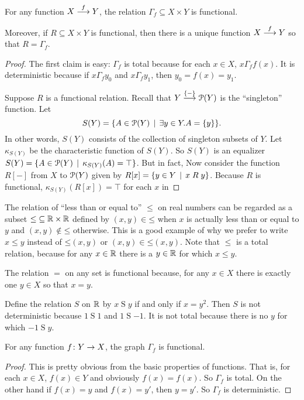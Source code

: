 \begin{lemma}
	For any function $\sfromto fXY$, the relation $\Gamma_f\subseteq X\times Y$ is functional.
	
	Moreover, if $R\subseteq X\times Y$ is functional, then there is a unique function $\sfromto fXY$ so that $R = \Gamma_f$.
	
	\begin{proof}
		The first claim is easy: $\Gamma_f$ is total because for each $x\in X$, $x\mathrel{\Gamma_f} f(x)$. It is deterministic because if $x\mathrel{\Gamma_f}y_0$ and $x\mathrel{\Gamma_f}y_1$, then $y_0 = f(x) = y_1$.
		
		Suppose $R$ is a functional relation. Recall that $\sfromto {\{-\}}Y{\powerset(Y)}$ is the ``singleton'' function. Let \[S(Y) = \{A\in\powerset(Y)\st \exists y\in Y.A = \{y\}\}.\]
		In other words, $S(Y)$ consists of the collection of singleton subsets of $Y$. 
		Let $\kappa_{S(Y)}$ be the characteristic function of $S(Y)$.
		So $S(Y)$ is an equalizer $S(Y) = \{A\in\powerset(Y)\st \kappa_{S(Y)}(A) = \top\}$. But in fact, 
		Now consider the function $R[-]$ from $X$ to $\powerset(Y)$ given by $R[x] = \{y\in Y\st x\mathrel{R}y\}$. Because $R$ is
		functional, $\kappa_{S(Y)}(R[x]) = \top$ for each $x$ in 
		
	\end{proof} 
\end{lemma}
\begin{example}
	The relation of ``less than or equal to'' $\leq$ on real numbers can be regarded as a subset 
	$\mathord{\leq}\subseteq {\RR\times\RR}$ defined by $(x,y) \in \mathord\leq$ when $x$ is actually less than or equal to $y$ and $(x,y)\notin \mathord\leq$ otherwise. 
	This is a good example of why we prefer to write $x\leq y$ instead of $\mathord\leq(x,y)$ or $(x,y)\in \mathord\leq(x,y)$. 
	Note that $\leq$ is a total relation, because for any $x\in \RR$ there is a $y\in \RR$ for which $x\leq y$.
	
	The relation $=$ on any set is functional because, for any $x\in X$ there is exactly one $y\in X$ so that $x=y$.
	
	Define the relation $S$ on $\RR$ by $x\mathrel{S}y$ if and only if $x = y^2$. 
	Then $S$ is not deterministic because $1\mathrel{S}1$ and $1\mathrel{S}-1$.
	It is not total because there is no $y$ for which $-1\mathrel{S}y$.
\end{example}



\begin{lemma}
	For any function $\fromto fYX$, the graph $\Gamma_f$ is functional.
	
	\begin{proof}
		This is pretty obvious from the basic properties of functions. That is,
		for each $x\in X$, $f(x)\in Y$ and obviously $f(x)=f(x)$. So $\Gamma_f$ is total. On the other hand if $f(x)=y$ and $f(x)=y'$, then $y=y'$. So $\Gamma_f$ is deterministic.
	\end{proof}
\end{lemma}

